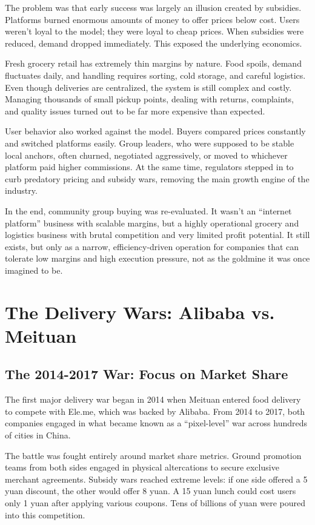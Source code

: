 The problem was that early success was largely an illusion created by subsidies. Platforms burned enormous amounts of money to offer prices below cost. Users weren't loyal to the model; they were loyal to cheap prices. When subsidies were reduced, demand dropped immediately. This exposed the underlying economics.

Fresh grocery retail has extremely thin margins by nature. Food spoils, demand fluctuates daily, and handling requires sorting, cold storage, and careful logistics. Even though deliveries are centralized, the system is still complex and costly. Managing thousands of small pickup points, dealing with returns, complaints, and quality issues turned out to be far more expensive than expected.

User behavior also worked against the model. Buyers compared prices constantly and switched platforms easily. Group leaders, who were supposed to be stable local anchors, often churned, negotiated aggressively, or moved to whichever platform paid higher commissions. At the same time, regulators stepped in to curb predatory pricing and subsidy wars, removing the main growth engine of the industry.

In the end, community group buying was re-evaluated. It wasn't an ``internet platform'' business with scalable margins, but a highly operational grocery and logistics business with brutal competition and very limited profit potential. It still exists, but only as a narrow, efficiency-driven operation for companies that can tolerate low margins and high execution pressure, not as the goldmine it was once imagined to be.

\section{The Delivery Wars: Alibaba vs. Meituan}

\subsection*{The 2014-2017 War: Focus on Market Share}

The first major delivery war began in 2014 when Meituan entered food delivery to compete with Ele.me, which was backed by Alibaba. From 2014 to 2017, both companies engaged in what became known as a ``pixel-level'' war across hundreds of cities in China.

The battle was fought entirely around market share metrics. Ground promotion teams from both sides engaged in physical altercations to secure exclusive merchant agreements. Subsidy wars reached extreme levels: if one side offered a 5 yuan discount, the other would offer 8 yuan. A 15 yuan lunch could cost users only 1 yuan after applying various coupons. Tens of billions of yuan were poured into this competition.

